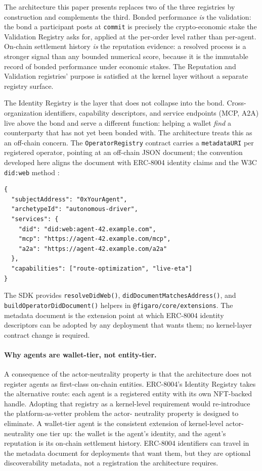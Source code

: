 \documentclass[11pt,a4paper]{article}
\theoremstyle{definition}
\theoremstyle{remark}
\begin{document}
The architecture this paper presents replaces two of the three
registries by construction and complements the third. Bonded
performance \emph{is} the validation: the bond a participant
posts at \texttt{commit} is precisely the crypto-economic stake
the Validation Registry asks for, applied at the per-order level
rather than per-agent. On-chain settlement history \emph{is} the
reputation evidence: a resolved process is a stronger signal than
any bounded numerical score, because it is the immutable record
of bonded performance under economic stakes. The Reputation and
Validation registries' purpose is satisfied at the kernel layer
without a separate registry surface.

The Identity Registry is the layer that does not collapse into the
bond. Cross-organization identifiers, capability descriptors, and
service endpoints (MCP, A2A) live above the bond and serve a
different function: helping a wallet \emph{find} a counterparty
that has not yet been bonded with. The architecture treats this
as an off-chain concern. The \texttt{OperatorRegistry} contract
carries a \texttt{metadataURI} per registered operator, pointing
at an off-chain JSON document; the convention developed here
aligns the document with ERC-8004 identity claims and the W3C
\texttt{did:web} method \citep{w3c_did_2022}:

\begin{lstlisting}
{
  "subjectAddress": "0xYourAgent",
  "archetypeId": "autonomous-driver",
  "services": {
    "did": "did:web:agent-42.example.com",
    "mcp": "https://agent-42.example.com/mcp",
    "a2a": "https://agent-42.example.com/a2a"
  },
  "capabilities": ["route-optimization", "live-eta"]
}
\end{lstlisting}

The SDK provides \texttt{resolveDidWeb()},
\texttt{didDocumentMatchesAddress()}, and
\texttt{buildOperatorDidDocument()} helpers in
\texttt{@figaro/core/extensions}. The metadata document is the
extension point at which ERC-8004 identity descriptors can be
adopted by any deployment that wants them; no kernel-layer
contract change is required.

\paragraph{Why agents are wallet-tier, not entity-tier.}
A consequence of the actor-neutrality property is that the
architecture does not register agents as first-class on-chain
entities. ERC-8004's Identity Registry takes the alternative
route: each agent is a registered entity with its own NFT-backed
handle. Adopting that registry as a kernel-level requirement
would re-introduce the platform-as-vetter problem the actor-
neutrality property is designed to eliminate. A wallet-tier
agent is the consistent extension of kernel-level
actor-neutrality one tier up: the wallet is the agent's identity,
and the agent's reputation is its on-chain settlement history.
ERC-8004 identifiers can travel in the metadata document for
deployments that want them, but they are optional discoverability
metadata, not a registration the architecture requires.
\end{document}
